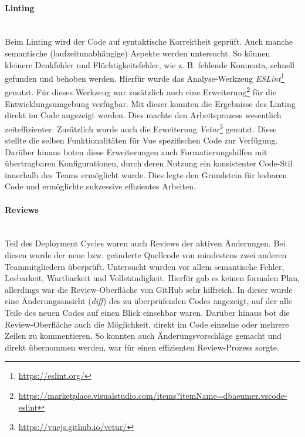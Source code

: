 \documentclass[10pt, a4paper]{article}
\begin{document}
\begin{onehalfspace}
    \paragraph*{Linting}$~$ \\
    Beim Linting wird der Code auf syntaktische Korrektheit geprüft.
    Auch manche semantische (laufzeitunabhängige) Aspekte werden untersucht.
    So können kleinere Denkfehler und Flüchtigkeitsfehler, wie z. B. fehlende Kommata, schnell gefunden und behoben werden.
    Hierfür wurde das Analyse-Werkzeug \textit{ESLint}\footnote{\raggedright\url{https://eslint.org/}} genutzt.
    Für dieses Werkzeug war zusätzlich auch eine Erweiterung\footnote{\raggedright\url{https://marketplace.visualstudio.com/items?itemName=dbaeumer.vscode-eslint}} für die Entwicklungsumgebung verfügbar.
    Mit dieser konnten die Ergebnisse des Linting direkt im Code angezeigt werden.
    Dies machte den Arbeitsprozess wesentlich zeiteffizienter.
    Zusätzlich wurde auch die Erweiterung \textit{Vetur}\footnote{\raggedright\url{https://vuejs.github.io/vetur/}} genutzt.
    Diese stellte die selben Funktionalitäten für Vue spezifischen Code zur Verfügung.
    \\
    Darüber hinaus boten diese Erweiterungen auch Formatierungshilfen mit übertragbaren Konfigurationen, durch deren Nutzung ein konsistenter Code-Stil
    innerhalb des Teams ermöglicht wurde. Dies legte den Grundstein für lesbaren Code und ermöglichte sukzessive effizientes Arbeiten.

    \paragraph*{Reviews}$~$ \\
    Teil des Deployment Cycles waren auch Reviews der aktiven Änderungen.
    Bei diesen wurde der neue bzw. geänderte Quellcode von mindestens zwei anderen Teammitgliedern überprüft.
    Untersucht wurden vor allem semantische Fehler, Lesbarkeit, Wartbarkeit und Vollständigkeit.
    Hierfür gab es keinen formalen Plan, allerdings war die Review-Oberfläche von GitHub sehr hilfreich.
    In dieser wurde eine Änderungsansicht (\textit{diff}) des zu überprüfenden Codes angezeigt, auf der alle Teile des neuen Codes auf einen Blick einsehbar waren.
    Darüber hinaus bot die Review-Oberfläche auch die Möglichkeit, direkt im Code einzelne oder mehrere Zeilen zu kommentieren.
    So konnten auch Änderungsvorschläge gemacht und direkt übernommen werden, war für einen effizienten Review-Prozess sorgte.


\end{onehalfspace}
\end{document}
